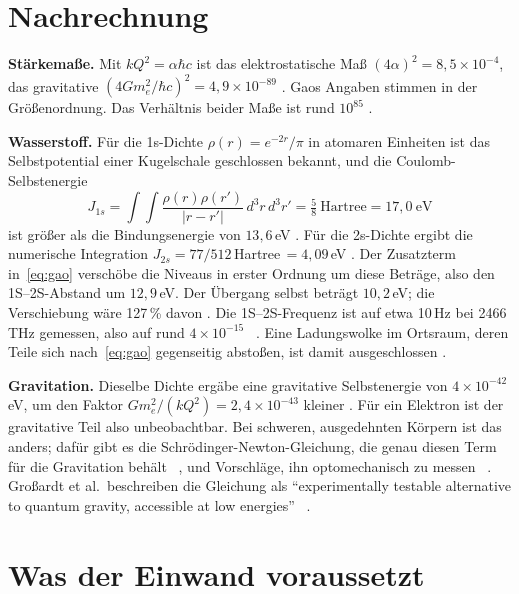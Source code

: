\section{Nachrechnung}

\textbf{Stärkemaße.} Mit $kQ^2=\alpha\hbar c$ ist das elektrostatische Maß $(4\alpha)^2=8{,}5\times10^{-4}$,
das gravitative $(4Gm_e^2/\hbar c)^2=4{,}9\times10^{-89}$ \KM. Gaos Angaben stimmen in der
Größenordnung. Das Verhältnis beider Maße ist rund $10^{85}$ \KM.

\textbf{Wasserstoff.} Für die 1s-Dichte $\rho(r)=e^{-2r}/\pi$ in atomaren Einheiten ist das
Selbstpotential einer Kugelschale geschlossen bekannt, und die Coulomb-Selbstenergie
\begin{equation}
  J_{1s}=\int\!\!\int\frac{\rho(r)\rho(r')}{|r-r'|}\,d^3r\,d^3r'=\tfrac58\ \text{Hartree}=17{,}0\ \text{eV}
\end{equation}
ist größer als die Bindungsenergie von $13{,}6$\,eV \KM. Für die 2s-Dichte ergibt die numerische
Integration $J_{2s}=77/512$\,Hartree$\,=4{,}09$\,eV \KM. Der Zusatzterm in~\eqref{eq:gao} verschöbe die
Niveaus in erster Ordnung um diese Beträge, also den 1S--2S-Abstand um $12{,}9$\,eV. Der Übergang
selbst beträgt $10{,}2$\,eV; die Verschiebung wäre 127\,\% davon \KM. Die 1S--2S-Frequenz ist auf
etwa 10\,Hz bei 2466\,THz gemessen, also auf rund $4\times10^{-15}$ \QM~\cite{Parthey2011}. Eine
Ladungswolke im Ortsraum, deren Teile sich nach~\eqref{eq:gao} gegenseitig abstoßen, ist damit
ausgeschlossen \XM.

\textbf{Gravitation.} Dieselbe Dichte ergäbe eine gravitative Selbstenergie von $4\times10^{-42}$\,eV,
um den Faktor $Gm_e^2/(kQ^2)=2{,}4\times10^{-43}$ kleiner \KM. Für ein Elektron ist der gravitative
Teil also unbeobachtbar. Bei schweren, ausgedehnten Körpern ist das anders; dafür gibt es die
Schrödinger-Newton-Gleichung, die genau diesen Term für die Gravitation behält
\QM~\cite{Diosi1984,Penrose1996}, und Vorschläge, ihn optomechanisch zu messen
\QM~\cite{Yang2013,Grossardt2016}. Großardt et al.\ beschreiben die Gleichung als
\enquote{experimentally testable alternative to quantum gravity, accessible at low energies}
\QM~\cite{Grossardt2016}.

\section{Was der Einwand voraussetzt}


